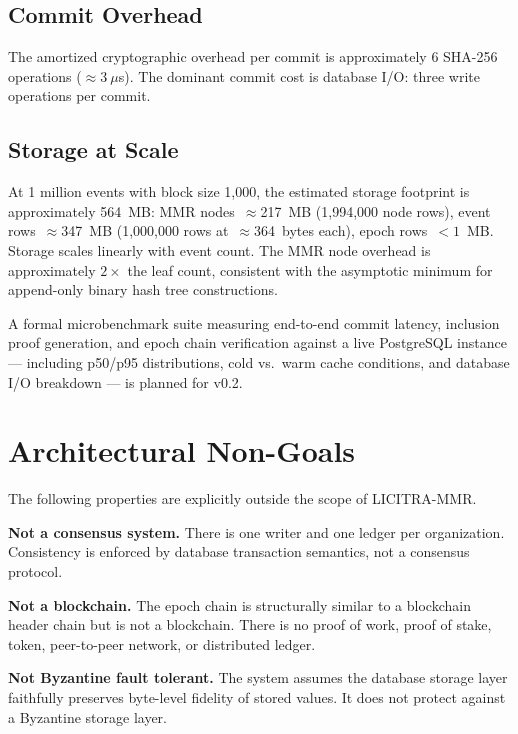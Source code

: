 \documentclass[sigconf,natbib=false]{acmart}
\begin{document}
\subsection{Commit Overhead}

The amortized cryptographic overhead per commit is approximately 6 SHA-256
operations ($\approx3~\mu$s). The dominant commit cost is database I/O:
three write operations per commit.

\subsection{Storage at Scale}

At 1 million events with block size 1,000, the estimated storage footprint
is approximately 564~MB: MMR nodes~$\approx$217~MB (1,994,000 node rows),
event rows~$\approx$347~MB (1,000,000 rows at~$\approx$364~bytes each),
epoch rows~$<1$~MB. Storage scales linearly with event count. The MMR node
overhead is approximately $2\times$ the leaf count, consistent with the
asymptotic minimum for append-only binary hash tree constructions.

A formal microbenchmark suite measuring end-to-end commit latency, inclusion
proof generation, and epoch chain verification against a live PostgreSQL
instance --- including p50/p95 distributions, cold vs.\ warm cache
conditions, and database I/O breakdown --- is planned for v0.2.

\section{Architectural Non-Goals}

The following properties are explicitly outside the scope of LICITRA-MMR.

\textbf{Not a consensus system.} There is one writer and one ledger per
organization. Consistency is enforced by database transaction semantics,
not a consensus protocol.

\textbf{Not a blockchain.} The epoch chain is structurally similar to a
blockchain header chain but is not a blockchain. There is no proof of work,
proof of stake, token, peer-to-peer network, or distributed ledger.

\textbf{Not Byzantine fault tolerant.} The system assumes the database
storage layer faithfully preserves byte-level fidelity of stored values.
It does not protect against a Byzantine storage layer.
\end{document}
